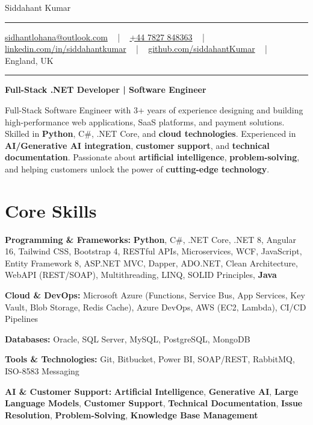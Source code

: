 \documentclass[letterpaper,10pt]{article}
\newcommand{\documentTitle}[2]{
  \begin{center}
    \vspace*{-0.3in}
    {\Huge\color{accentTitle} #1}
    \vspace{8pt}
    {\color{accentLine} \hrule}
    \vspace{2pt}
    \footnotesize{#2}
    \vspace{2pt}
    {\color{accentLine} \hrule}
  \end{center}
}
\newenvironment{resume_list}{
  \vspace{-7pt}
  \begin{itemize}[itemsep=-2px, parsep=1pt, leftmargin=30pt]
}{
  \end{itemize}
}
\begin{document}
\documentTitle{Siddahant Kumar}{
\vspace{0.1cm}
\href{mailto:sidhantlohana@outlook.com}{sidhantlohana@outlook.com} ~ | ~
\href{tel:+447827848363}{+44 7827 848363} ~ | ~
\href{https://www.linkedin.com/in/siddahantkumar/}{linkedin.com/in/siddahantkumar} ~ | ~
\href{https://github.com/siddahantKumar}{github.com/siddahantKumar} ~ | ~
England, UK
}

\begin{center}
\textbf{Full-Stack .NET Developer | Software Engineer}
\end{center}

Full-Stack Software Engineer with 3+ years of experience designing and building high-performance web applications, SaaS platforms, and payment solutions. Skilled in \textbf{Python}, C\#, .NET Core, and \textbf{cloud technologies}. Experienced in \textbf{AI/Generative AI integration}, \textbf{customer support}, and \textbf{technical documentation}. Passionate about \textbf{artificial intelligence}, \textbf{problem-solving}, and helping customers unlock the power of \textbf{cutting-edge technology}.


\section{Core Skills}

\begin{resume_list}
    \item \textbf{Programming \& Frameworks:} \textbf{Python}, C\#, .NET Core, .NET 8, Angular 16, Tailwind CSS, Bootstrap 4, RESTful APIs, Microservices, WCF, JavaScript, Entity Framework 8, ASP.NET MVC, Dapper, ADO.NET, Clean Architecture, WebAPI (REST/SOAP), Multithreading, LINQ, SOLID Principles, \textbf{Java}
    \item \textbf{Cloud \& DevOps:} Microsoft Azure (Functions, Service Bus, App Services, Key Vault, Blob Storage, Redis Cache), Azure DevOps, AWS (EC2, Lambda), CI/CD Pipelines
    \item \textbf{Databases:} Oracle, SQL Server, MySQL, PostgreSQL, MongoDB
    \item \textbf{Tools \& Technologies:} Git, Bitbucket, Power BI, SOAP/REST, RabbitMQ, ISO-8583 Messaging
    \item \textbf{AI \& Customer Support:} \textbf{Artificial Intelligence}, \textbf{Generative AI}, \textbf{Large Language Models}, \textbf{Customer Support}, \textbf{Technical Documentation}, \textbf{Issue Resolution}, \textbf{Problem-Solving}, \textbf{Knowledge Base Management}
\end{resume_list}
\end{document}
